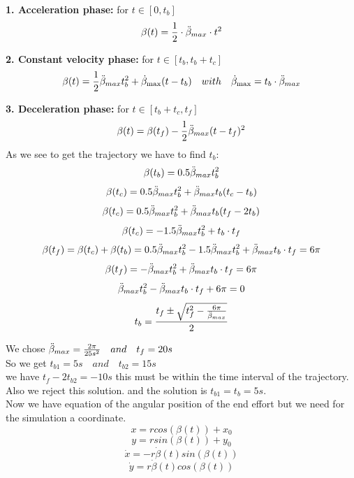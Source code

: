\textbf{1. Acceleration phase:}  for \( t \in [0, t_b] \)
\[
\beta(t) =  \frac{1}{2} \cdot \Ddot{\beta}_{max} \cdot t^2
\]

\textbf{2. Constant velocity phase:} for \( t \in [t_b, t_b + t_c] \)
\[
\beta(t) = \frac{1}{2} \Ddot{\beta}_{max} t_b^2 + \dot{\beta}_{\text{max}} (t - t_b) \quad with \quad \dot{\beta}_{\text{max}} = t_b \cdot \Ddot{\beta}_{max} 
\]


\textbf{3. Deceleration phase:}  for \( t \in [t_b + t_c, t_f] \)
\[
\beta(t) = \beta(t_f) - \frac{1}{2} \Ddot{\beta}_{max} (t - t_f)^2
\]
As we see to get the trajectory we have to find $t_b$: \\
\[
\beta(t_b) =0.5 \Ddot{\beta}_{max} t_b^2
\]
\[
\beta(t_c) =0.5 \Ddot{\beta}_{max} t_b^2 + \Ddot{\beta}_{max} t_b (t_c-t_b) 
\]
\[
\beta(t_c) =0.5 \Ddot{\beta}_{max} t_b^2 + \Ddot{\beta}_{max} t_b (t_f-2t_b) 
\]
\[
\beta(t_c) =-1.5 \Ddot{\beta}_{max} t_b^2 + t_b \cdot t_f 
\]
\[
\beta(t_f) =\beta(t_c) + \beta(t_b) = 0.5 \Ddot{\beta}_{max} t_b^2  -1.5 \Ddot{\beta}_{max} t_b^2 + \Ddot{\beta}_{max} t_b \cdot t_f = 6 \pi
\]
\[
\beta(t_f) = -\Ddot{\beta}_{max} t_b^2 + \Ddot{\beta}_{max} t_b \cdot t_f = 6 \pi
\]
\[
 \Ddot{\beta}_{max} t_b^2 - \Ddot{\beta}_{max} t_b \cdot t_f +6 \pi = 0
\]
\[
t_b =  \frac{t_f \pm \sqrt{ t_f^2- \frac{6\pi}{\Ddot{\beta}_{max} }}}{2}
\]

We chose $\Ddot{\beta}_{max} = \frac{2 \pi}{25s^2} \quad and \quad t_f = 20s $\\
So we get $t_{b1}= 5 s \quad and\quad t_{b2} =15s $ \\
we have $ t_f-2t_{b2} = -10s$ this must be within the time interval of the trajectory. Also we reject this solution.  
and the solution is $t_{b1}=t_b=5s$. \\
Now we have  equation of the angular position of the end effort but we need for the simulation a coordinate.  
\[
 x=r cos(\beta(t))+x_0 
\]
\[
 y=r sin(\beta(t))+y_0
\]
\[
 \dot{x}=-r\dot{\beta}(t)sin(\beta(t))
\]
\[
\dot{y}=r\dot{\beta}(t)cos(\beta(t)) 
\]

